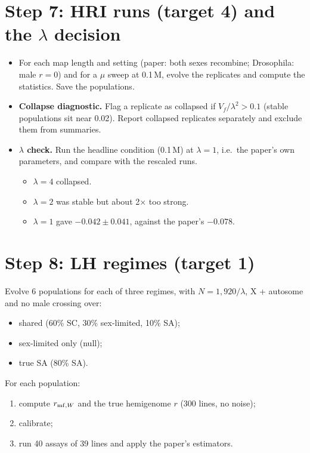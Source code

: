 \section{Step 7: HRI runs (target 4) and the $\lambda$ decision}
\begin{itemize}
\item For each map length and setting (paper: both sexes recombine; Drosophila: male $r=0$) and for a $\mu$ sweep at 0.1\,M, evolve the replicates and compute the statistics. Save the populations.
\item \textbf{Collapse diagnostic.} Flag a replicate as collapsed if $V_f/\lambda^2>0.1$ (stable populations sit near 0.02). Report collapsed replicates separately and exclude them from summaries.
\item \textbf{$\lambda$ check.} Run the headline condition (0.1\,M) at $\lambda=1$, i.e.\ the paper's own parameters, and compare with the rescaled runs.
  \begin{itemize}
  \item $\lambda=4$ collapsed.
  \item $\lambda=2$ was stable but about 2$\times$ too strong.
  \item $\lambda=1$ gave $-0.042\pm0.041$, against the paper's $-0.078$.
  \end{itemize}
\end{itemize}

\section{Step 8: LH regimes (target 1)}
Evolve 6 populations for each of three regimes, with $N=1{,}920/\lambda$, X + autosome and no male crossing over:
\begin{itemize}
\item shared (60\% SC, 30\% sex-limited, 10\% SA);
\item sex-limited only (null);
\item true SA (80\% SA).
\end{itemize}
For each population:
\begin{enumerate}
\item compute $r_{\mathrm{mf},W}$ and the true hemigenome $r$ (300 lines, no noise);
\item calibrate;
\item run 40 assays of 39 lines and apply the paper's estimators.
\end{enumerate}

